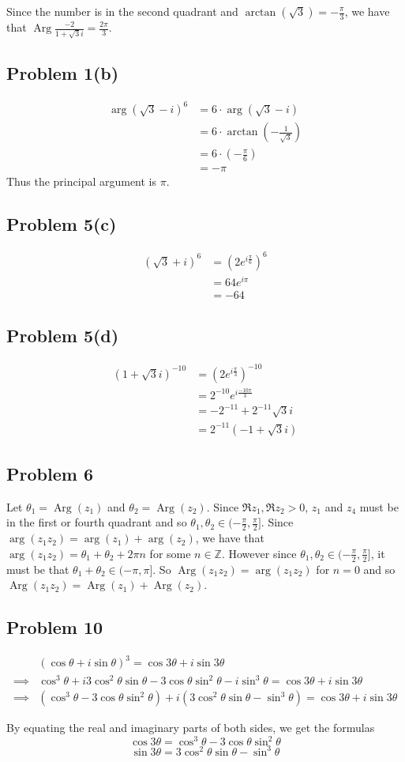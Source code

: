 \documentclass{article}
\DeclareMathOperator\Arg{Arg}
\begin{document}
Since the number is in the second quadrant and $\arctan(\sqrt{3}) = -\frac{\pi}{3}$,
we have that $\Arg \frac{-2}{1+\sqrt{3} i} = \frac{2\pi}{3}$.
\subsection*{Problem 1(b)}
\begin{align*}
	\arg(\sqrt{3} - i)^6 &= 6\cdot\arg(\sqrt{3} - i) \\
	&= 6\cdot\arctan(-\frac{1}{\sqrt{3}}) \\
	&= 6\cdot\left(-\frac{\pi}{6}\right) \\
	&= -\pi
\end{align*}
Thus the principal argument is $\pi$.
\subsection*{Problem 5(c)}
\begin{align*}
	(\sqrt{3} + i)^6 &= (2e^{i\frac{\pi}{6}})^6 \\
	&= 64e^{i\pi} \\
	&= -64
\end{align*}
\subsection*{Problem 5(d)}
\begin{align*}
	(1+\sqrt{3} i)^{-10} &= (2e^{i\frac{\pi}{3}})^{-10} \\
	&= 2^{-10}e^{i\frac{-10\pi}{3}} \\
	&= -2^{-11}+ 2^{-11}\sqrt{3}i \\
	&= 2^{-11}(-1+\sqrt{3}i)
\end{align*}
\subsection*{Problem 6}
Let $\theta_1 = \Arg(z_1)$ and $\theta_2 = \Arg(z_2)$.
Since $\Re z_1, \Re z_2 > 0$, $z_1$ and $z_4$ 
must be in the first or fourth quadrant and so
$\theta_1, \theta_2 \in (-\frac{\pi}{2}, \frac{\pi}{2}]$.
Since $\arg(z_1z_2) = \arg(z_1) + \arg(z_2)$, we have that 
$\arg(z_1z_2) = \theta_1 + \theta_2 + 2\pi n$ for some $n\in \mathbb{Z}$.
However since $\theta_1, \theta_2 \in (-\frac{\pi}{2}, \frac{\pi}{2}]$,
it must be that $\theta_1 + \theta_2 \in (-\pi, \pi]$. 
So $\Arg(z_1z_2) = \arg(z_1z_2)$ for $n=0$ and so 
$\Arg(z_1z_2) = \Arg(z_1) + \Arg(z_2)$.

\newpage 
\subsection*{Problem 10}
\begin{align*}
	&(\cos \theta + i \sin \theta)^3 = \cos 3\theta + i\sin 3\theta \\
	\implies& \cos^3 \theta + i3\cos^2\theta \sin \theta - 3\cos \theta \sin^2 \theta - i\sin^3 \theta = \cos 3\theta + i\sin 3\theta \\
	\implies& (\cos^3 \theta - 3\cos\theta \sin^2 \theta) + i(3\cos^2\theta \sin \theta - \sin^3 \theta) = \cos 3\theta + i\sin 3\theta
\end{align*}

By equating the real and imaginary parts of both sides, we get the formulas
\[
	\cos 3\theta = \cos^3 \theta - 3\cos\theta \sin^2 \theta
\]
\[
	\sin 3\theta = 3\cos^2\theta \sin \theta - \sin^3 \theta
\]
\end{document}
